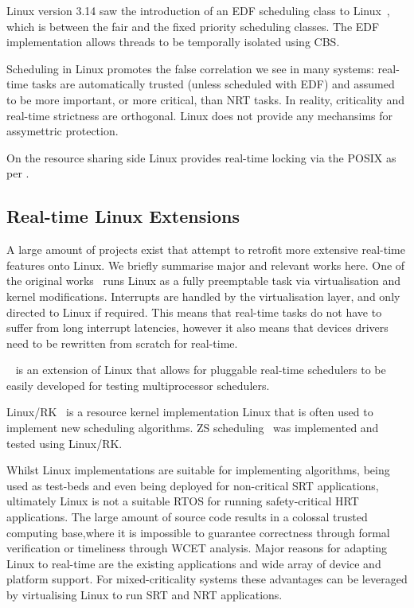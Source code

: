 Linux version 3.14 saw the introduction of an \gls{EDF} scheduling class to Linux~\citep{Corbet_2009}, which is between the fair and the fixed priority scheduling classes.
The \gls{EDF} implementation allows threads to be temporally isolated using \gls{CBS}.

Scheduling in Linux promotes the false correlation we see in many systems: real-time tasks are automatically trusted (unless scheduled with \gls{EDF}) and assumed to be more important, or more critical, than \gls{NRT} tasks.
In reality, criticality and real-time strictness are orthogonal.
Linux does not provide any mechansims for assymettric protection.

On the resource sharing side Linux provides real-time locking via the POSIX  as per .
 
\subsection{Real-time Linux Extensions}

A large amount of projects exist that attempt to retrofit more extensive real-time features onto Linux.
We briefly summarise major and relevant works here. 
One of the original works~\citep{Yodaiken_Barabanov_97} runs Linux as a fully preemptable task via virtualisation and kernel modifications.
Interrupts are handled by the virtualisation layer, and only directed to Linux if required.
This means that real-time tasks do not have to suffer from long interrupt latencies, however it also means that devices drivers need to be rewritten from scratch for real-time.

\litmus~\citep{Calandrino_LBDA_2007} is an extension of Linux that allows for pluggable real-time schedulers to be easily developed for testing multiprocessor schedulers.

Linux/RK~\citep{Oikawa_Rajkumar_1998} is a resource kernel implementation Linux that is often used to implement new scheduling algorithms.
\gls{ZS} scheduling~\citep{deNiz_LR_2009} was implemented and tested using Linux/RK.

Whilst Linux implementations are suitable for implementing algorithms, being used as test-beds and even being deployed for non-critical \gls{SRT} applications, ultimately Linux is not a suitable \gls{RTOS} for running safety-critical \gls{HRT} applications. The large amount of source code results in a colossal trusted computing base,where it is impossible to guarantee correctness through formal verification or timeliness through {\gls{WCET}} analysis.  Major reasons for adapting Linux to real-time are the existing applications and wide array of device and platform support. For mixed-criticality systems these advantages can be leveraged by virtualising Linux to run \gls{SRT} and \gls{NRT} applications.

